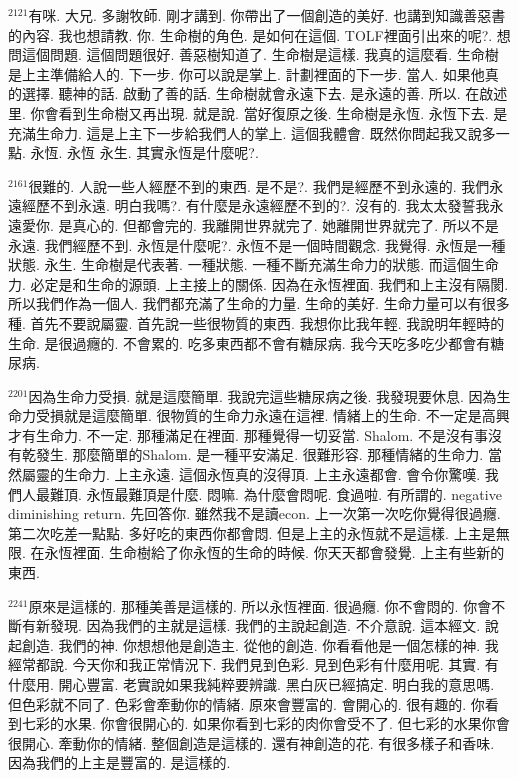 \documentclass{book}
\begin{document}
$^{2121}$有咪.
大兄.
多謝牧師.
剛才講到.
你帶出了一個創造的美好.
也講到知識善惡書的內容.
我也想請教.
你.
生命樹的角色.
是如何在這個.
TOLF裡面引出來的呢?.
想問這個問題.
這個問題很好.
善惡樹知道了.
生命樹是這樣.
我真的這麼看.
生命樹是上主準備給人的.
下一步.
你可以說是掌上.
計劃裡面的下一步.
當人.
如果他真的選擇.
聽神的話.
啟動了善的話.
生命樹就會永遠下去.
是永遠的善.
所以.
在啟述里.
你會看到生命樹又再出現.
就是說.
當好復原之後.
生命樹是永恆.
永恆下去.
是充滿生命力.
這是上主下一步給我們人的掌上.
這個我體會.
既然你問起我又說多一點.
永恆.
永恆 永生.
其實永恆是什麼呢?.

$^{2161}$很難的.
人說一些人經歷不到的東西.
是不是?.
我們是經歷不到永遠的.
我們永遠經歷不到永遠.
明白我嗎?.
有什麼是永遠經歷不到的?.
沒有的.
我太太發誓我永遠愛你.
是真心的.
但都會完的.
我離開世界就完了.
她離開世界就完了.
所以不是永遠.
我們經歷不到.
永恆是什麼呢?.
永恆不是一個時間觀念.
我覺得.
永恆是一種狀態.
永生.
生命樹是代表著.
一種狀態.
一種不斷充滿生命力的狀態.
而這個生命力.
必定是和生命的源頭.
上主接上的關係.
因為在永恆裡面.
我們和上主沒有隔閡.
所以我們作為一個人.
我們都充滿了生命的力量.
生命的美好.
生命力量可以有很多種.
首先不要說屬靈.
首先說一些很物質的東西.
我想你比我年輕.
我說明年輕時的生命.
是很過癮的.
不會累的.
吃多東西都不會有糖尿病.
我今天吃多吃少都會有糖尿病.

$^{2201}$因為生命力受損.
就是這麼簡單.
我說完這些糖尿病之後.
我發現要休息.
因為生命力受損就是這麼簡單.
很物質的生命力永遠在這裡.
情緒上的生命.
不一定是高興才有生命力.
不一定.
那種滿足在裡面.
那種覺得一切妥當.
Shalom.
不是沒有事沒有乾發生.
那麼簡單的Shalom.
是一種平安滿足.
很難形容.
那種情緒的生命力.
當然屬靈的生命力.
上主永遠.
這個永恆真的沒得頂.
上主永遠都會.
會令你驚嘆.
我們人最難頂.
永恆最難頂是什麼.
悶嘛.
為什麼會悶呢.
食過啦.
有所謂的.
negative diminishing return.
先回答你.
雖然我不是讀econ.
上一次第一次吃你覺得很過癮.
第二次吃差一點點.
多好吃的東西你都會悶.
但是上主的永恆就不是這樣.
上主是無限.
在永恆裡面.
生命樹給了你永恆的生命的時候.
你天天都會發覺.
上主有些新的東西.

$^{2241}$原來是這樣的.
那種美善是這樣的.
所以永恆裡面.
很過癮.
你不會悶的.
你會不斷有新發現.
因為我們的主就是這樣.
我們的主說起創造.
不介意說.
這本經文.
說起創造.
我們的神.
你想想他是創造主.
從他的創造.
你看看他是一個怎樣的神.
我經常都說.
今天你和我正常情況下.
我們見到色彩.
見到色彩有什麼用呢.
其實.
有什麼用.
開心豐富.
老實說如果我純粹要辨識.
黑白灰已經搞定.
明白我的意思嗎.
但色彩就不同了.
色彩會牽動你的情緒.
原來會豐富的.
會開心的.
很有趣的.
你看到七彩的水果.
你會很開心的.
如果你看到七彩的肉你會受不了.
但七彩的水果你會很開心.
牽動你的情緒.
整個創造是這樣的.
還有神創造的花.
有很多樣子和香味.
因為我們的上主是豐富的.
是這樣的.
\end{document}

